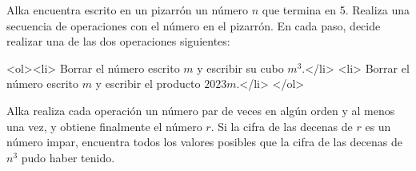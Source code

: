 Alka encuentra escrito en un pizarrón un número $n$ que termina en 5. Realiza una secuencia de operaciones con el número en el pizarrón. En cada paso, decide realizar una de las dos operaciones siguientes:


<ol><li> Borrar el número escrito $m$ y escribir su cubo $m^3$.</li>
<li> Borrar el número escrito $m$ y escribir el producto $2023m$.</li>
</ol>


Alka realiza cada operación un número par de veces en algún orden y al menos una vez, y obtiene finalmente el número $r$. Si la cifra de las decenas de $r$ es un número impar, encuentra todos los valores posibles que la cifra de las decenas de $n^3$ pudo haber tenido.